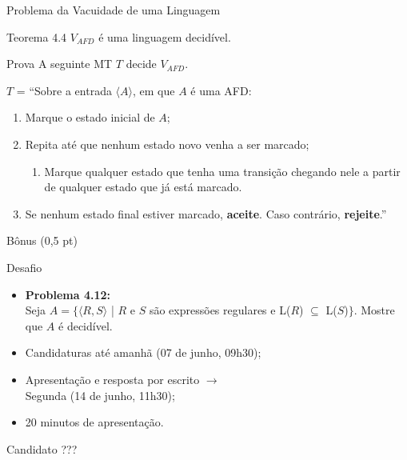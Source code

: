 \documentclass[xcolor=dvipsnames,table]{beamer}
\begin{document}
	\begin{frame}{Problema da Vacuidade de uma Linguagem}
		\begin{block}{Teorema 4.4}
			$V_{AFD}$ é uma linguagem decidível.
		\end{block} \pause
		\begin{block}{Prova}
			A seguinte MT $T$ decide $V_{AFD}$.
			
			$T$ = ``Sobre a entrada $\langle A \rangle$, em que $A$ é uma AFD:
			\begin{enumerate}
				\item Marque o estado inicial de $A$;
				\item Repita até que nenhum estado novo venha a ser marcado;
					\begin{enumerate}
						\item Marque qualquer estado que tenha uma transição chegando nele a partir de qualquer estado que já está marcado.
					\end{enumerate}
				\item Se nenhum estado final estiver marcado, {\bf aceite}. Caso contrário, {\bf rejeite}.''
			\end{enumerate}
		\end{block}
	\end{frame}
	
	\begin{frame}{Bônus (0,5 pt)}
		\begin{block}{Desafio}
			\begin{itemize}
				\item {\bf Problema 4.12:} \\Seja $A = \{ \langle R, S \rangle$ | $R$ e $S$ são expressões regulares e L($R$) $\subseteq$ L($S$)$\}$. Mostre que $A$ é decidível.
                \item Candidaturas até amanhã (07 de junho, 09h30); 
                \item Apresentação e resposta por escrito $\rightarrow$ \\Segunda (14 de junho, 11h30); 
                \item 20 minutos de apresentação.
			\end{itemize}
		\end{block} 
        \begin{block}{Candidato}
        	???
        \end{block}
	\end{frame}
	
	\begin{frame}
		\titlepage
	\end{frame}
	
\end{document}
